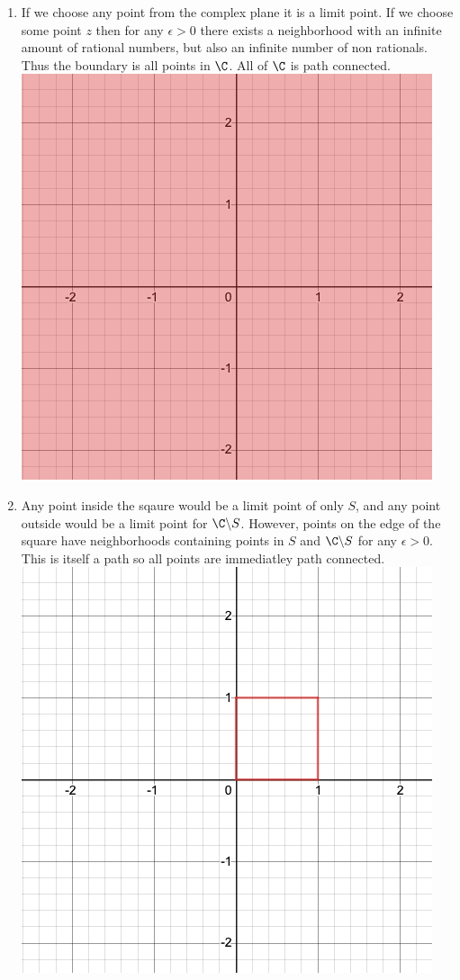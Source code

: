 \documentclass{article}
\begin{document}
\begin{enumerate}
\begin{enumerate}[label=\roman*]
        \item
          If we choose any point from the complex plane it is a limit point. If we choose some point $z$ then for any $\epsilon>0$ there exists a neighborhood with an infinite amount of rational numbers, but also an infinite number of non rationals. Thus the boundary is all points in $\C$. All of $\C$ is path connected.\\
          \includegraphics[scale=0.5]{graphs/iii}
        \item
          Any point inside the sqaure would be a limit point of only $S$, and any point outside would be a limit point for $\C\backslash S$. However, points on the edge of the square have neighborhoods containing points in $S$ and $\C\backslash S$ for any $\epsilon>0$. This is itself a path so all points are immediatley path connected.\\
          \includegraphics[scale=0.5]{graphs/iv}

\end{enumerate}
\end{enumerate}
\end{document}
